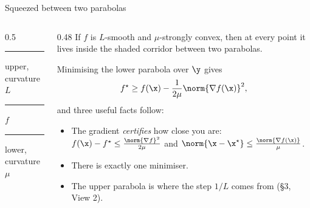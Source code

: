 \begin{frame}{Squeezed between two parabolas}
  \begin{columns}[T]
    \begin{column}{0.5\textwidth}
      \centering
      

      \scriptsize
      \textcolor{mRed}{\rule[2pt]{10pt}{1.1pt}} upper, curvature $L$ \quad
      \textcolor{mInk}{\rule[2pt]{10pt}{1.8pt}} $f$ \quad
      \textcolor{mBlue}{\rule[2pt]{10pt}{1.1pt}} lower, curvature $\mu$
    \end{column}
    \begin{column}{0.48\textwidth}
      \small
      If $f$ is $L$-smooth and $\mu$-strongly convex, then at every point it lives inside the shaded corridor
      between two parabolas.

      \vspace{3pt}
      Minimising the lower parabola over $\y$ gives
      \[
        f^\star \ge f(\x) - \frac{1}{2\mu}\norm{\nabla f(\x)}^2 ,
      \]
      and three useful facts follow:
      \begin{itemize}\footnotesize
        \item The gradient \emph{certifies} how close you are: $f(\x)-f^\star\le\frac{\norm{\nabla f}^2}{2\mu}$ and
              $\norm{\x-\x^\star}\le\frac{\norm{\nabla f(\x)}}{\mu}$.
        \item There is exactly one minimiser.
        \item The upper parabola is where the step $1/L$ comes from (\S3, View 2).
      \end{itemize}
    \end{column}
  \end{columns}
\end{frame}

